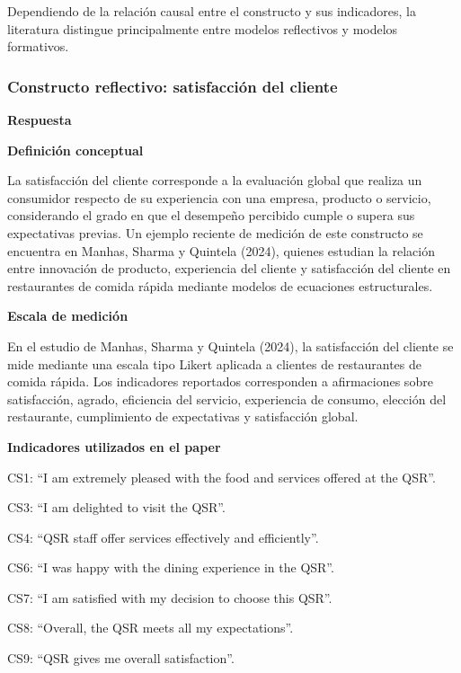 \documentclass[12pt,letterpaper]{article}
\begin{document}
Dependiendo de la relación causal entre el constructo y sus indicadores, la literatura distingue principalmente entre modelos reflectivos y modelos formativos.

\subsubsection*{Constructo reflectivo: satisfacción del cliente}

\textbf{Respuesta}

\textbf{Definición conceptual}

La satisfacción del cliente corresponde a la evaluación global que realiza un consumidor respecto de su experiencia con una empresa, producto o servicio, considerando el grado en que el desempeño percibido cumple o supera sus expectativas previas. Un ejemplo reciente de medición de este constructo se encuentra en Manhas, Sharma y Quintela (2024), quienes estudian la relación entre innovación de producto, experiencia del cliente y satisfacción del cliente en restaurantes de comida rápida mediante modelos de ecuaciones estructurales.

\textbf{Escala de medición}

En el estudio de Manhas, Sharma y Quintela (2024), la satisfacción del cliente se mide mediante una escala tipo Likert aplicada a clientes de restaurantes de comida rápida. Los indicadores reportados corresponden a afirmaciones sobre satisfacción, agrado, eficiencia del servicio, experiencia de consumo, elección del restaurante, cumplimiento de expectativas y satisfacción global.

\textbf{Indicadores utilizados en el paper}

\begin{opciones}
\item CS1: ``I am extremely pleased with the food and services offered at the QSR''.
\item CS3: ``I am delighted to visit the QSR''.
\item CS4: ``QSR staff offer services effectively and efficiently''.
\item CS6: ``I was happy with the dining experience in the QSR''.
\item CS7: ``I am satisfied with my decision to choose this QSR''.
\item CS8: ``Overall, the QSR meets all my expectations''.
\item CS9: ``QSR gives me overall satisfaction''.
\end{opciones}
\end{document}

